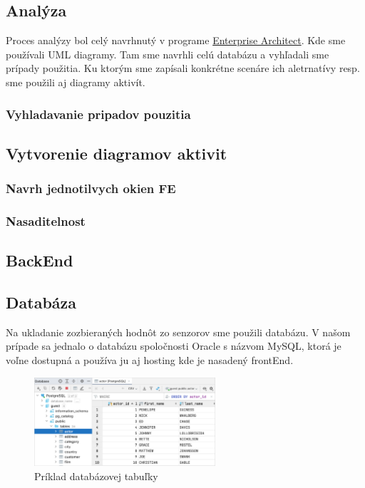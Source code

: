 \subsection{Analýza}
Proces analýzy bol celý navrhnutý v programe \href{https://sparxsystems.com/}{Enterprise Architect}. Kde sme používali \acs{UML} diagramy. Tam sme navrhli celú databázu a vyhľadali sme prípady použitia. Ku ktorým sme zapísali konkrétne scenáre ich aletrnatívy resp. sme použili aj diagramy aktivít. 
\subsubsection{Vyhladavanie pripadov pouzitia}
\subsection{Vytvorenie diagramov aktivit}
\subsubsection{Navrh jednotilvych okien \acl{FE}}
\subsubsection{}
\subsubsection{Nasaditelnost}


\subsection{BackEnd}

\subsection{Databáza}
Na ukladanie zozbieraných hodnôt zo senzorov sme použili databázu. V našom prípade sa jednalo o databázu spoločnosti Oracle s názvom MySQL, ktorá je voľne dostupná a používa ju aj hosting kde je nasadený frontEnd.
\begin{figure}[h!]
    \centering
    \includegraphics[width=0.6\textwidth]{obrazky/Table.png}
    \caption{Príklad databázovej tabuľky}
\end{figure}

